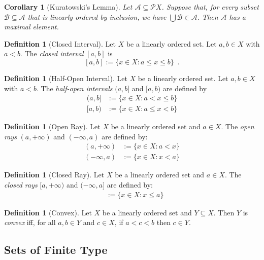 \documentclass{book}
\newtheorem{cor}{Corollary}[ax]
\theoremstyle{definition}
\newtheorem{df}[ax]{Definition}
\begin{document}
\begin{cor}[Kuratowski's Lemma]
Let $\mathcal{A} \subseteq \mathcal{P} X$. Suppose that, for every subset $\mathcal{B} \subseteq \mathcal{A}$ that is linearly ordered by inclusion, we have $\bigcup \mathcal{B} \in \mathcal{A}$. Then $\mathcal{A}$ has a maximal element.
\end{cor}

\begin{df}[Closed Interval]
Let $X$ be a linearly ordered set. Let $a,b \in X$ with $a < b$. The \emph{closed interval} $[a,b]$ is
\[ [a,b] := \{ x \in X : a \leq x \leq b \} \enspace . \]
\end{df}

\begin{df}[Half-Open Interval]
Let $X$ be a linearly ordered set. Let $a,b \in X$ with $a < b$. The \emph{half-open intervals} $(a,b]$ and $[a,b)$ are defined by
\begin{align*}
(a,b] & := \{ x \in X : a < x \leq b \} \\
[a,b) & := \{ x \in X : a \leq x < b \}
\end{align*}
\end{df}

\begin{df}[Open Ray]
Let $X$ be a linearly ordered set and $a \in X$. The \emph{open rays} $(a, +\infty)$ and $(-\infty, a)$ are defined by:
\begin{align*}
(a, +\infty) & := \{ x \in X : a < x \} \\
(-\infty, a) & := \{ x \in X : x < a \}
\end{align*}
\end{df}

\begin{df}[Closed Ray]
Let $X$ be a linearly ordered set and $a \in X$. The \emph{closed rays} $[a, +\infty)$ and $(-\infty, a]$ are defined by:
\begin{align*}
[a, +\infty) & := \{ x \in X : a \leq x \} \\
(-\infty, a] & := \{ x \in X : x \leq a \}
\end{align*}
\end{df}

\begin{df}[Convex]
Let $X$ be a linearly ordered set and $Y \subseteq X$. Then $Y$ is \emph{convex} iff, for all $a,b \in Y$ and $c \in X$, if $a < c < b$ then $c \in Y$.
\end{df}

\subsection{Sets of Finite Type}
\end{document}
